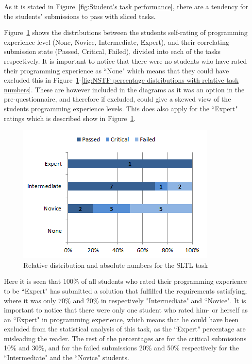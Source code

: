 \documentclass{sig-alternate-05-2015}
\begin{document}
As it is stated in Figure~\ref{fig:Student's task performance}, there are a tendency for the students' submissions to pass with sliced tasks.

Figure~\ref{fig:SLTL percentage distributions with relative task numbers} shows the distributions between the students self-rating of programming experience level (None, Novice, Intermediate, Expert), and their correlating submission state (Passed, Critical, Failed), divided into each of the tasks respectively.
It is important to notice that there were no students who have rated their programming experience  as ``None" which means that they could have excluded this in Figure~\ref{fig:SLTL percentage distributions with relative task numbers}-\ref{fig:NSTF percentage distributions with relative task numbers}. These are however included in the diagrams as it was an option in the pre-questionnaire, and therefore if excluded, could give a skewed view of the students programming experience levels. This does also apply for the ``Expert" ratings which is described show in Figure~\ref{fig:SLTL percentage distributions with relative task numbers}.

\begin{figure}[!ht]
	\centering
	\includegraphics[width=1\linewidth]{img06}
	\caption{Relative distribution and absolute numbers for the SLTL task}
	\label{fig:SLTL percentage distributions with relative task numbers}
\end{figure}

Here it is seen that 100\% of all students who rated their programming experience to be ``Expert" has submitted a solution that fulfilled the requirements satisfying, where it was only 70\% and 20\% in respectively "Intermediate" and ``Novice".
It is important to notice that there were only one student who rated him- or herself as an ``Expert" in programming experience, which means that he could have been excluded from the statistical analysis of this task, as the ``Expert" percentage are misleading the reader. The rest of the percentages are for the critical submissions 10\% and 30\%, and for the failed submissions 20\% and 50\% respectively for the ``Intermediate" and the ``Novice" students.
\end{document}
